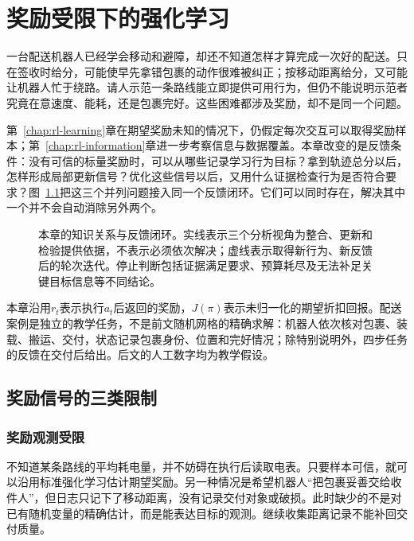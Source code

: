 \chapter{奖励受限下的强化学习}
\label{chap:rl-reward}

一台配送机器人已经学会移动和避障，却还不知道怎样才算完成一次好的配送。只在签收时给分，可能使早先拿错包裹的动作很难被纠正；按移动距离给分，又可能让机器人忙于绕路。请人示范一条路线能立即提供可用行为，但仍不能说明示范者究竟在意速度、能耗，还是包裹完好。这些困难都涉及奖励，却不是同一个问题。

第~\ref{chap:rl-learning}章在期望奖励未知的情况下，仍假定每次交互可以取得奖励样本；第~\ref{chap:rl-information}章进一步考察信息与数据覆盖。本章改变的是反馈条件：没有可信的标量奖励时，可以从哪些记录学习行为目标？拿到轨迹总分以后，怎样形成局部更新信号？优化这些信号以后，又用什么证据检查行为是否符合要求？图~\ref{fig:rl-reward-map}把这三个并列问题接入同一个反馈闭环。它们可以同时存在，解决其中一个并不会自动消除另外两个。

\begin{figure}[htbp]
  \centering
  
  \caption{本章的知识关系与反馈闭环。实线表示三个分析视角为整合、更新和检验提供依据，不表示必须依次解决；虚线表示取得新行为、新反馈后的轮次迭代。停止判断包括证据满足要求、预算耗尽及无法补足关键目标信息等不同结论。}
  \label{fig:rl-reward-map}
\end{figure}

本章沿用$r_t$表示执行$a_t$后返回的奖励，$J(\pi)$表示未归一化的期望折扣回报。配送案例是独立的教学任务，不是前文随机网格的精确求解：机器人依次核对包裹、装载、搬运、交付，状态记录包裹身份、位置和完好情况；除特别说明外，四步任务的反馈在交付后给出。后文的人工数字均为教学假设。

\section{奖励信号的三类限制}
\label{sec:rl-reward-limits}

\subsection{奖励观测受限}
\label{sec:rl-reward-observation}

不知道某条路线的平均耗电量，并不妨碍在执行后读取电表。只要样本可信，就可以沿用标准强化学习估计期望奖励。另一种情况是希望机器人“把包裹妥善交给收件人”，但日志只记下了移动距离，没有记录交付对象或破损。此时缺少的不是对已有随机变量的精确估计，而是能表达目标的观测。继续收集距离记录不能补回交付质量。

